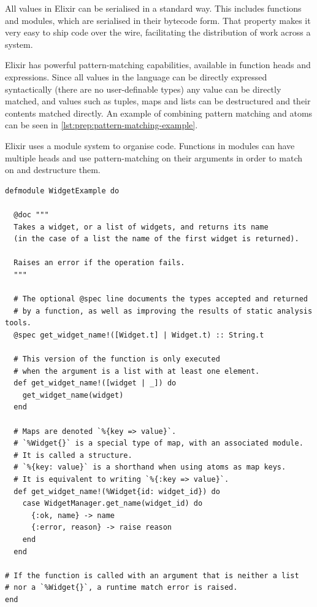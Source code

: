 All values in Elixir can be serialised in a standard way.
This includes functions and modules, which are serialised in their bytecode form.
That property makes it very easy to ship code over the wire, facilitating the distribution of work across a system.

Elixir has powerful pattern-matching capabilities, available in function heads and  expressions.
Since all values in the language can be directly expressed syntactically (there are no user-definable types) any value can be directly matched, and values such as tuples, maps and lists can be destructured and their contents matched directly.
An example of combining pattern matching and atoms can be seen in \cref{lst:prep:pattern-matching-example}.

\begin{listing}[h]
	\caption[An example Elixir module, showcasing modules and pattern-matching.]{Elixir uses a module system to organise code. Functions in modules can have multiple heads and use pattern-matching on their arguments in order to match on and destructure them.}
	\label{lst:prep:pattern-matching-example}
	\begin{verbatim}
defmodule WidgetExample do

  @doc """
  Takes a widget, or a list of widgets, and returns its name
  (in the case of a list the name of the first widget is returned).

  Raises an error if the operation fails. 
  """
  
  # The optional @spec line documents the types accepted and returned
  # by a function, as well as improving the results of static analysis tools. 
  @spec get_widget_name!([Widget.t] | Widget.t) :: String.t
  
  # This version of the function is only executed
  # when the argument is a list with at least one element.
  def get_widget_name!([widget | _]) do
    get_widget_name(widget)
  end

  # Maps are denoted `%{key => value}`.
  # `%Widget{}` is a special type of map, with an associated module.
  # It is called a structure.
  # `%{key: value}` is a shorthand when using atoms as map keys.
  # It is equivalent to writing `%{:key => value}`.  
  def get_widget_name!(%Widget{id: widget_id}) do
    case WidgetManager.get_name(widget_id) do
      {:ok, name} -> name
      {:error, reason} -> raise reason
    end
  end

# If the function is called with an argument that is neither a list
# nor a `%Widget{}`, a runtime match error is raised.
end
	\end{verbatim}
\end{listing}

